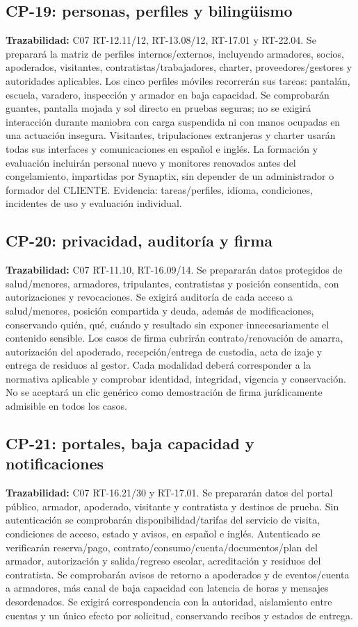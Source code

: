 \subsection{CP-19: personas, perfiles y bilingüismo}
\label{caso:cp-19}
\textbf{Trazabilidad:} C07 RT-12.11/12, RT-13.08/12, RT-17.01 y RT-22.04. Se preparará la matriz de perfiles internos/externos, incluyendo armadores, socios, apoderados, visitantes, contratistas/trabajadores, charter, proveedores/gestores y autoridades aplicables. Los cinco perfiles móviles recorrerán sus tareas: pantalán, escuela, varadero, inspección y armador en baja capacidad. Se comprobarán guantes, pantalla mojada y sol directo en pruebas seguras; no se exigirá interacción durante maniobra con carga suspendida ni con manos ocupadas en una actuación insegura. Visitantes, tripulaciones extranjeras y charter usarán todas sus interfaces y comunicaciones en español e inglés. La formación y evaluación incluirán personal nuevo y monitores renovados antes del congelamiento, impartidas por Synaptix, sin depender de un administrador o formador del CLIENTE. Evidencia: tareas/perfiles, idioma, condiciones, incidentes de uso y evaluación individual.

\subsection{CP-20: privacidad, auditoría y firma}
\label{caso:cp-20}
\textbf{Trazabilidad:} C07 RT-11.10, RT-16.09/14. Se prepararán datos protegidos de salud/menores, armadores, tripulantes, contratistas y posición consentida, con autorizaciones y revocaciones. Se exigirá auditoría de cada acceso a salud/menores, posición compartida y deuda, además de modificaciones, conservando quién, qué, cuándo y resultado sin exponer innecesariamente el contenido sensible. Los casos de firma cubrirán contrato/renovación de amarra, autorización del apoderado, recepción/entrega de custodia, acta de izaje y entrega de residuos al gestor. Cada modalidad deberá corresponder a la normativa aplicable y comprobar identidad, integridad, vigencia y conservación. No se aceptará un clic genérico como demostración de firma jurídicamente admisible en todos los casos.

\subsection{CP-21: portales, baja capacidad y notificaciones}
\label{caso:cp-21}
\textbf{Trazabilidad:} C07 RT-16.21/30 y RT-17.01. Se prepararán datos del portal público, armador, apoderado, visitante y contratista y destinos de prueba. Sin autenticación se comprobarán disponibilidad/tarifas del servicio de visita, condiciones de acceso, estado y avisos, en español e inglés. Autenticado se verificarán reserva/pago, contrato/consumo/cuenta/documentos/plan del armador, autorización y salida/regreso escolar, acreditación y residuos del contratista. Se comprobarán avisos de retorno a apoderados y de eventos/cuenta a armadores, más canal de baja capacidad con latencia de horas y mensajes desordenados. Se exigirá correspondencia con la autoridad, aislamiento entre cuentas y un único efecto por solicitud, conservando recibos y estados de entrega.

